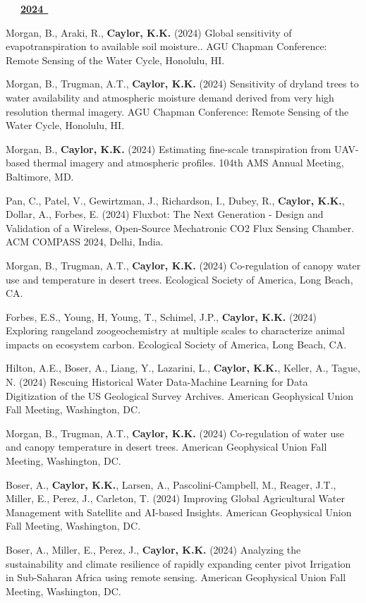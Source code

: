 
                                                                                                
    

\mbox{\ \ \ \underline{\textbf{2024 }}}

\begin{etaremune}

\item Morgan, B., Araki, R., \textbf{ Caylor, K.K.} (2024) Global sensitivity of evapotranspiration to available soil moisture.. AGU Chapman Conference: Remote Sensing of the Water Cycle, Honolulu, HI.
\item Morgan, B., Trugman, A.T., \textbf{ Caylor, K.K.} (2024) Sensitivity of dryland trees to water availability and atmospheric moisture demand derived from very high resolution thermal imagery. AGU Chapman Conference: Remote Sensing of the Water Cycle, Honolulu, HI.
\item Morgan, B., \textbf{ Caylor, K.K.} (2024) Estimating fine-scale transpiration from UAV-based thermal imagery and atmospheric profiles. 104th AMS Annual Meeting, Baltimore, MD.
\item Pan, C., Patel, V., Gewirtzman, J., Richardson, I., Dubey, R., \textbf{ Caylor, K.K.}, Dollar, A., Forbes, E. (2024) Fluxbot: The Next Generation - Design and Validation of a Wireless, Open-Source Mechatronic CO2 Flux Sensing Chamber. ACM COMPASS 2024, Delhi, India.
\item Morgan, B., Trugman, A.T., \textbf{ Caylor, K.K.} (2024) Co-regulation of canopy water use and temperature in desert trees. Ecological Society of America, Long Beach, CA.
\item Forbes, E.S., Young, H, Young, T., Schimel, J.P., \textbf{ Caylor, K.K.} (2024) Exploring rangeland zoogeochemistry at multiple scales to characterize animal impacts on ecosystem carbon. Ecological Society of America, Long Beach, CA.
\item Hilton, A.E., Boser, A., Liang, Y., Lazarini, L., \textbf{ Caylor, K.K.}, Keller, A., Tague, N. (2024) Rescuing Historical Water Data-Machine Learning for Data Digitization of the US Geological Survey Archives. American Geophysical Union Fall Meeting, Washington, DC.
\item Morgan, B., Trugman, A.T., \textbf{ Caylor, K.K.} (2024) Co-regulation of water use and canopy temperature in desert trees. American Geophysical Union Fall Meeting, Washington, DC.
\item Boser, A., \textbf{ Caylor, K.K.}, Larsen, A., Pascolini-Campbell, M., Reager, J.T., Miller, E., Perez, J., Carleton, T. (2024) Improving Global Agricultural Water Management with Satellite and AI-based Insights. American Geophysical Union Fall Meeting, Washington, DC.
\item Boser, A., Miller, E., Perez, J., \textbf{ Caylor, K.K.} (2024) Analyzing the sustainability and climate resilience of rapidly expanding center pivot Irrigation in Sub-Saharan Africa using remote sensing. American Geophysical Union Fall Meeting, Washington, DC.



\end{etaremune}
